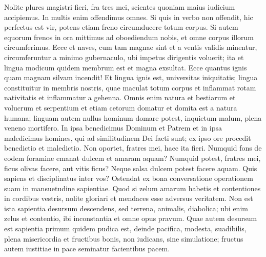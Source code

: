 \begin{biblechapter}
\begin{biblechapter}
\begin{biblechapter}
\verse Nolite plures magistri fieri, fra tres mei, scientes quoniam maius iudicium accipiemus. 
\verse In multis enim offendimus omnes. Si quis in verbo non offendit, hic perfectus est vir, potens etiam freno circumducere totum corpus. 
\verse Si autem equorum frenos in ora mittimus ad oboediendum nobis, et omne corpus illorum circumferimus. 
\verse Ecce et naves, cum tam magnae sint et a ventis validis minentur, circumferuntur a minimo gubernaculo, ubi impetus dirigentis voluerit; 
\verse ita et lingua modicum quidem membrum est et magna exsultat. Ecce quantus ignis quam magnam silvam incendit! 
\verse Et lingua ignis est, universitas iniquitatis; lingua constituitur in membris nostris, quae maculat totum corpus et inflammat rotam nativitatis et inflammatur a gehenna. 
\verse Omnis enim natura et bestiarum et volucrum et serpentium et etiam cetorum domatur et domita est a natura humana; 
\verse linguam autem nullus hominum domare potest, inquietum malum, plena veneno mortifero. 
\verse In ipsa benedicimus Dominum et Patrem et in ipsa maledicimus homines, qui ad similitudinem Dei facti sunt; 
\verse ex ipso ore procedit benedictio et maledictio. Non oportet, fratres mei, haec ita fieri. 
 \verse Numquid fons de eodem foramine emanat dulcem et amaram aquam? 
\verse Numquid potest, fratres mei, ficus olivas facere, aut vitis ficus? Neque salsa dulcem potest facere aquam.
 \verse Quis sapiens et disciplinatus inter vos? Ostendat ex bona conversatione operationem suam in mansuetudine sapientiae. 
\verse Quod si zelum amarum habetis et contentiones in cordibus vestris, nolite gloriari et mendaces esse adversus veritatem. 
\verse Non est ista sapientia desursum descendens, sed terrena, animalis, diabolica; 
\verse ubi enim zelus et contentio, ibi inconstantia et omne opus pravum. 
\verse Quae autem desursum est sapientia primum quidem pudica est, deinde pacifica, modesta, suadibilis, plena misericordia et fructibus bonis, non iudicans, sine simulatione; 
\verse fructus autem iustitiae in pace seminatur facientibus pacem.
 

\end{biblechapter}
\end{biblechapter}
\end{biblechapter}
